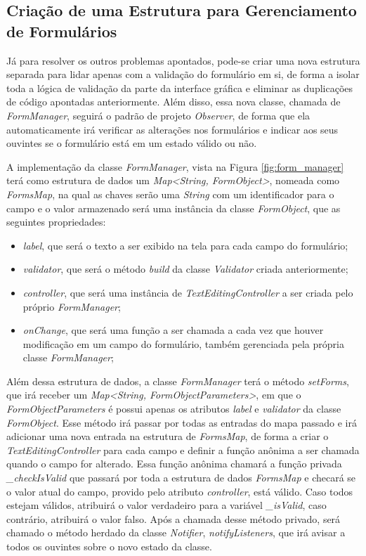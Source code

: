 \documentclass[12pt, %
openright, 
oneside, %
a4paper,    %
brazil]{facom-ufu-abntex2}
\begin{document}
\subsection{Criação de uma Estrutura para Gerenciamento de Formulários}

Já para resolver os outros problemas apontados, pode-se criar uma nova estrutura separada para lidar apenas com a validação do formulário em si, de forma a isolar toda a lógica de validação da parte da interface gráfica e eliminar as duplicações de código apontadas anteriormente. Além disso, essa nova classe, chamada de \textit{FormManager}, seguirá o padrão de projeto \textit{Observer}, de forma que ela automaticamente irá verificar as alterações nos formulários e indicar aos seus ouvintes se o formulário está em um estado válido ou não.

A implementação da classe \textit{FormManager}, vista na Figura \ref{fig:form_manager} terá como estrutura de dados um \textit{Map<String, FormObject>}, nomeada como \textit{FormsMap}, na qual as chaves serão uma \textit{String} com um identificador para o campo e o valor armazenado será uma instância da classe \textit{FormObject}, que as seguintes propriedades:

\begin{itemize}
    \item \textit{label}, que será o texto a ser exibido na tela para cada campo do formulário;
    \item \textit{validator}, que será o método \textit{build} da classe \textit{Validator} criada anteriormente;
    \item \textit{controller}, que será uma instância de \textit{TextEditingController} a ser criada pelo próprio \textit{FormManager};
    \item \textit{onChange}, que será uma função a ser chamada a cada vez que houver modificação em um campo do formulário, também gerenciada pela própria classe \textit{FormManager};
\end{itemize}

Além dessa estrutura de dados, a classe \textit{FormManager} terá o método \textit{setForms}, que irá receber um \textit{Map<String, FormObjectParameters>}, em que o \textit{FormObjectParameters} é possui apenas os atributos \textit{label} e \textit{validator} da classe \textit{FormObject}. Esse método irá passar por todas as entradas do mapa passado e irá adicionar uma nova entrada na estrutura de \textit{FormsMap}, de forma a criar o \textit{TextEditingController} para cada campo e definir a função anônima a ser chamada quando o campo for alterado. Essa função anônima chamará a função privada \textit{\_checkIsValid} que passará por toda a estrutura de dados \textit{FormsMap} e checará se o valor atual do campo, provido pelo atributo \textit{controller}, está válido. Caso todos estejam válidos, atribuirá o valor verdadeiro para a variável \textit{\_isValid}, caso contrário, atribuirá o valor falso. Após a chamada desse método privado, será chamado o método herdado da classe \textit{Notifier}, \textit{notifyListeners}, que irá avisar a todos os ouvintes sobre o novo estado da classe.
\end{document}
